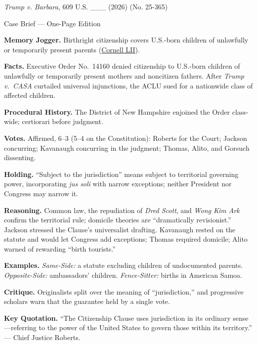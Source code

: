 \documentclass[12pt]{article}
\begin{document}
\begin{center}
{\Large \textit{Trump v. Barbara}, 609 U.S. \_\_\_ (2026) (No. 25-365)\par}
\vspace{0.3em}
{\normalsize Case Brief --- One-Page Edition\par}
\end{center}

\textbf{Memory Jogger.} Birthright citizenship covers U.S.-born children of unlawfully or temporarily present parents (\href{https://www.law.cornell.edu/supremecourt/text/25-365}{Cornell LII}).

\textbf{Facts.} Executive Order No.~14160 denied citizenship to U.S.-born children of unlawfully or temporarily present mothers and noncitizen fathers. After \textit{Trump v.\ CASA} curtailed universal injunctions, the ACLU sued for a nationwide class of affected children.

\textbf{Procedural History.} The District of New Hampshire enjoined the Order class-wide; certiorari before judgment.

\textbf{Votes.} Affirmed, 6--3 (5--4 on the Constitution): Roberts for the Court; Jackson concurring; Kavanaugh concurring in the judgment; Thomas, Alito, and Gorsuch dissenting.

\textbf{Holding.} ``Subject to the jurisdiction'' means subject to territorial governing power, incorporating \textit{jus soli} with narrow exceptions; neither President nor Congress may narrow it.

\textbf{Reasoning.} Common law, the repudiation of \textit{Dred Scott}, and \textit{Wong Kim Ark} confirm the territorial rule; domicile theories are ``dramatically revisionist.'' Jackson stressed the Clause's universalist drafting. Kavanaugh rested on the statute and would let Congress add exceptions; Thomas required domicile; Alito warned of rewarding ``birth tourists.''

\textbf{Examples.} \emph{Same-Side:} a statute excluding children of undocumented parents. \emph{Opposite-Side:} ambassadors' children. \emph{Fence-Sitter:} births in American Samoa.

\textbf{Critique.} Originalists split over the meaning of ``jurisdiction,'' and progressive scholars warn that the guarantee held by a single vote.

\textbf{Key Quotation.} ``The Citizenship Clause uses jurisdiction in its ordinary sense---referring to the power of the United States to govern those within its territory.'' --- Chief Justice Roberts.
\end{document}
